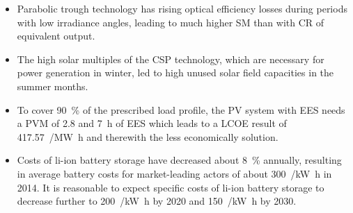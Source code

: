 \begin{itemize}
\item Parabolic trough technology has rising optical efficiency losses during periods with low irradiance angles, leading to much higher \ac{SM} than with \ac{CR} of equivalent output.


\item The high solar multiples of the \ac{CSP} technology, which are necessary for power generation in winter, led to high unused solar field capacities in the summer months.



\item To cover \SI{90}{\percent} of the prescribed load profile, the \ac{PV} system with \ac{EES} needs a \ac{PVM} of \num{2.8} and \SI{7}{\hour} of \ac{EES} which leads to a \ac{LCOE} result of \SI{417.57}{\usd/\mega\watt\hour} and therewith the less economically solution.



\item Costs of \ac{li-ion} battery storage have decreased about \SI{8}{\percent} annually, resulting in average battery costs for market-leading actors of about \SI{300}{\usd/\kilo\watt\hour} in 2014. It is reasonable to expect specific costs of \ac{li-ion} battery storage to decrease further to \SI{200}{\usd/\kilo\watt\hour} by 2020 and \SI{150}{\usd/\kilo\watt\hour} by 2030.



\end{itemize}
